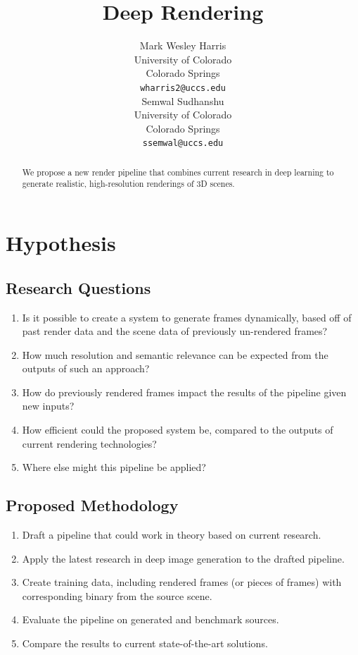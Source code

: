 \documentclass{article}
\title{Deep Rendering}
\author{Mark Wesley Harris\\
University of Colorado\\
Colorado Springs\\
\texttt{wharris2@uccs.edu} \\
\And
Semwal Sudhanshu\\
University of Colorado\\
Colorado Springs\\
\texttt{ssemwal@uccs.edu} \\
}
\begin{document}
\maketitle

\begin{abstract}
We propose a new render pipeline that combines current research in deep learning
to generate realistic, high-resolution renderings of 3D scenes.
\end{abstract}

\section{Hypothesis}
\label{sec:hypothesis}

\subsection{Research Questions}
\label{subsec:questions}
\begin{enumerate}
\item Is it possible to create a system to generate frames dynamically, based off of past render data and the scene data of previously un-rendered frames?
\item How much resolution and semantic relevance can be expected from the outputs of such an approach?
\item How do previously rendered frames impact the results of the pipeline given new inputs?
\item How efficient could the proposed system be, compared to the outputs of current rendering technologies?
\item Where else might this pipeline be applied?
\end{enumerate}

\subsection{Proposed Methodology}
\label{subsec:methodology}
\begin{enumerate}
\item Draft a pipeline that could work in theory based on current research.
\item Apply the latest research in deep image generation to the drafted pipeline.
\item Create training data, including rendered frames (or pieces of frames) with corresponding binary from the source scene.
\item Evaluate the pipeline on generated and benchmark sources.
\item Compare the results to current state-of-the-art solutions.
\end{enumerate}
\end{document}
